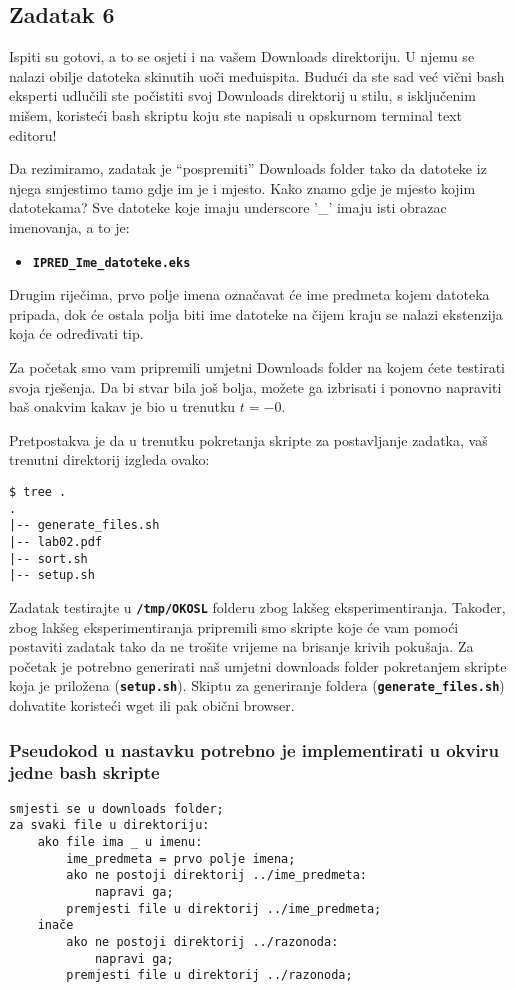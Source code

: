 \documentclass[12pt,a4paper]{article}
\newcommand{\shell}[1]{\texttt{\textbf{#1}}}
\begin{document}
    \subsection*{Zadatak 6}
    Ispiti su gotovi, a to se osjeti i na vašem Downloads direktoriju. U njemu
    se nalazi obilje datoteka skinutih uoči međuispita. Budući da ste sad već
    vični bash eksperti udlučili ste počistiti svoj Downloads direktorij u
    stilu, s isključenim mišem, koristeći bash skriptu koju ste napisali u
    opskurnom terminal text editoru!

    Da rezimiramo, zadatak je ``pospremiti'' Downloads folder tako da datoteke iz
    njega smjestimo tamo gdje im je i mjesto. Kako znamo gdje je mjesto kojim
    datotekama? Sve datoteke koje imaju underscore '\_' imaju isti obrazac
    imenovanja, a to je:

    \begin{itemize}
        \item[] \shell{IPRED\_Ime\_datoteke.eks}
    \end{itemize}

    Drugim riječima, prvo polje imena označavat će ime predmeta kojem datoteka
    pripada, dok će ostala polja biti ime datoteke na čijem kraju se nalazi
    ekstenzija koja će određivati tip.

    Za početak smo vam pripremili umjetni Downloads folder na kojem ćete
    testirati svoja rješenja. Da bi stvar bila još bolja, možete ga izbrisati
    i ponovno napraviti baš onakvim kakav je bio u trenutku $t = -0$.

    Pretpostakva je da u trenutku pokretanja skripte za postavljanje zadatka,
    vaš trenutni direktorij izgleda ovako:

    \begin{verbatim}
$ tree .
.
|-- generate_files.sh
|-- lab02.pdf
|-- sort.sh
|-- setup.sh
    \end{verbatim}

    Zadatak testirajte u \shell{/tmp/OKOSL} folderu zbog lakšeg eksperimentiranja.
    Također, zbog lakšeg eksperimentiranja pripremili smo skripte koje će vam pomoći
    postaviti zadatak tako da ne trošite vrijeme na brisanje krivih pokušaja.
    Za početak je potrebno generirati naš umjetni downloads folder pokretanjem
    skripte koja je priložena (\shell{setup.sh}). Skiptu za generiranje foldera
    (\shell{generate\_files.sh}) dohvatite koristeći wget ili pak obični browser.

    \subsubsection*{Pseudokod u nastavku potrebno je implementirati u okviru jedne
    bash skripte}
    \begin{verbatim}
smjesti se u downloads folder;
za svaki file u direktoriju:
    ako file ima _ u imenu:
        ime_predmeta = prvo polje imena;
        ako ne postoji direktorij ../ime_predmeta:
            napravi ga;
        premjesti file u direktorij ../ime_predmeta;
    inače
        ako ne postoji direktorij ../razonoda:
            napravi ga;
        premjesti file u direktorij ../razonoda;
    \end{verbatim}
\end{document}
